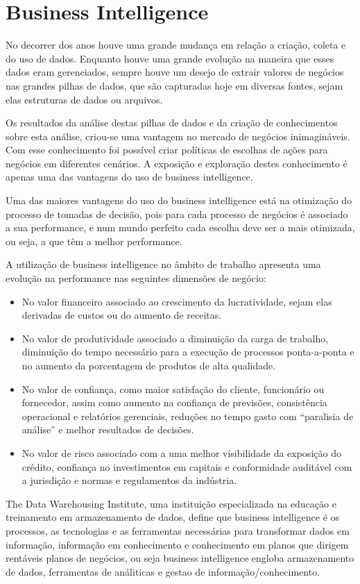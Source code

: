 \section{Business Intelligence}
No decorrer dos anos houve uma grande mudança em relação a criação, coleta e do uso de dados. Enquanto houve uma grande evolução na maneira que esses dados eram gerenciados, sempre houve um desejo de extrair valores de negócios nas grandes pilhas de dados, que são capturadas hoje em diversas fontes, sejam elas estruturas de dados ou arquivos.

Os resultados da análise destas pilhas de dados e da criação de conhecimentos sobre esta análise, criou-se uma vantagem no mercado de negócios inimagináveis. Com esse conhecimento foi possível criar políticas de escolhas de ações para negócios em diferentes cenários. A exposição e exploração destes conhecimento é apenas uma das vantagens do uso de business intelligence.

Uma das maiores vantagens do uso do business intelligence está na otimização do processo de tomadas de decisão, pois para cada processo de negócios é associado a sua performance, e num mundo perfeito cada escolha deve ser a mais otimizada, ou seja, a que têm a melhor performance\cite{business_intelligence}.

A utilização de business intelligence no âmbito de trabalho apresenta uma evolução na performance nas seguintes dimensões de negócio:
\begin{itemize}
		\item No valor financeiro associado ao crescimento da lucratividade, sejam elas derivadas de custos ou do aumento de receitas.
		\item No valor de produtividade associado a diminuição da carga de trabalho, diminuição do tempo necessário para a execução de processos ponta-a-ponta e no aumento da porcentagem de produtos de alta qualidade.
		\item No valor de confiança, como maior satisfação do cliente, funcionário ou fornecedor, assim como aumento na confiança de previsões, consistência operacional e relatórios gerenciais, reduções no tempo gasto com “paralisia de análise” e melhor resultados de decisões.
		\item No valor de risco associado com a uma melhor visibilidade da exposição do crédito, confiança no investimentos em capitais e conformidade auditável com a jurisdição e normas e regulamentos da indústria.
\end{itemize}
The Data Warehousing Institute\cite{tdwi}, uma instituição especializada na educação e treinamento em armazenamento de dados, define que business intelligence é os processos, as tecnologias e as ferramentas necessárias para transformar dados em informação, informação em conhecimento e conhecimento em planos que dirigem rentáveis planos de negócios, ou seja business intelligence engloba armazenamento de dados, ferramentas de análiticas e gestao de informação/conhecimento. 

